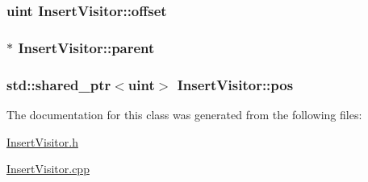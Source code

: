 \subsubsection[{offset}]{\setlength{\rightskip}{0pt plus 5cm}uint Insert\+Visitor\+::offset\hspace{0.3cm}{\ttfamily [protected]}}\label{classInsertVisitor_a46d57991e7305aff32cc2c8033986fc2}
\hypertarget{classInsertVisitor_a33db65fd081bd0448763274f1ca4632d}{}
\subsubsection[{parent}]{$\ast$ Insert\+Visitor\+::parent\hspace{0.3cm}{\ttfamily [protected]}}\label{classInsertVisitor_a33db65fd081bd0448763274f1ca4632d}
\hypertarget{classInsertVisitor_aeb7469f88fb024421c1dd9cfd3608d7d}{}
\subsubsection[{pos}]{\setlength{\rightskip}{0pt plus 5cm}std\+::shared\+\_\+ptr$<$uint$>$ Insert\+Visitor\+::pos\hspace{0.3cm}{\ttfamily [protected]}}\label{classInsertVisitor_aeb7469f88fb024421c1dd9cfd3608d7d}


The documentation for this class was generated from the following files\+:\begin{DoxyCompactItemize}
\item 
\hyperlink{InsertVisitor_8h}{Insert\+Visitor.\+h}\item 
\hyperlink{InsertVisitor_8cpp}{Insert\+Visitor.\+cpp}\end{DoxyCompactItemize}
